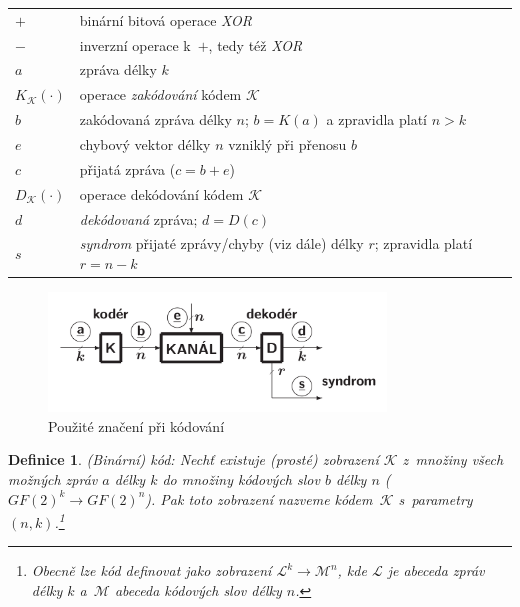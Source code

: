 \documentclass[thesis=M,czech,hidelinks]{FITthesis}[2012/06/26]
\newcommand{\0}{{\textcolor[gray]{0.75}{0}}}
\newtheorem{definice}{Definice}
\begin{document}
\begin{center}
\begin{tabular}{l p{10cm}}
    $+$     &   binární bitová operace \emph{XOR} \\
    $-$     &   inverzní operace k~$+$, tedy též \emph{XOR} \\
    $a$     &   zpráva délky $k$ \\
    $K_{\mathcal{K}}(\cdot)$ &   operace \emph{zakódování} kódem $\mathcal{K}$ \\
    $b$     &   zakódovaná zpráva délky $n$; $b=K(a)$ a zpravidla platí $n>k$ \\
    $e$     &   chybový vektor délky $n$ vzniklý při přenosu $b$ \\
    $c$     &   přijatá zpráva ($c=b+e$) \\
    $D_{\mathcal{K}}(\cdot)$ &   operace dekódování kódem $\mathcal{K}$ \\
    $d$     &   \emph{dekódovaná} zpráva; $d=D(c)$ \\
    $s$     &   \emph{syndrom} přijaté zprávy/chyby (viz dále) délky $r$;
                zpravidla platí $r=n-k$ \\
\end{tabular}
\end{center}

\begin{figure}
    \centering
    \includegraphics[width=0.8\textwidth]{materialy/aak-kodovani.png}
    \caption{Použité značení při kódování~\cite{FIT_AAK}}
    \label{obr_kodovani}
\end{figure}


\begin{definice}{(Binární) kód:}
    Nechť existuje (prosté) zobrazení $\mathcal{K}$ z~množiny všech možných
    zpráv $a$ délky $k$ do množiny kódových slov $b$ délky $n$
    ($GF(2)^k \rightarrow GF(2)^n$). Pak toto zobrazení nazveme
    kódem~$\mathcal{K}$ s~parametry $(n,k)$.\footnote{
        Obecně lze \emph{kód} definovat jako zobrazení $\mathcal{L}^k
        \rightarrow \mathcal{M}^n$, kde $\mathcal{L}$ je \emph{abeceda} zpráv
        délky $k$ a~$\mathcal{M}$ abeceda kódových slov délky $n$.
    }
\end{definice}
\end{document}
